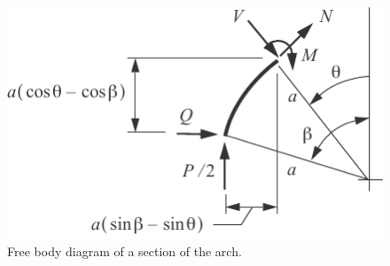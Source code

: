 \documentclass{AeroStructure-ERJohnson}
\begin{document}
\begin{example}
\begin{figure}
\vspace{-30pt}
\includegraphics{Figure_7-8.pdf}
\caption{Free body diagram of a section of the arch\vspace*{16pt}.\label{fig7.8}}
\end{figure}


\end{example}
\end{document}
